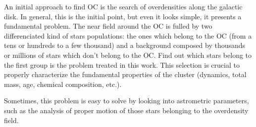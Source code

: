 \documentclass[11pt, a4paper, english]{book}
\begin{document}

An initial approach to find OC is the search of overdensities along the galactic disk. In general, this is the initial point,
but even it looks simple, it presents a fundamental problem. The near field around the OC is fulled by two differenciated
kind of stars populations: the ones which belong to the OC (from a tens or hundreds to a few thousand) and a background composed
by thousands or millions of stars which don't belong to the OC. Find out which stars belong to the first group is the problem
treated in this work. This selection is crucial to properly characterize the fundamental properties of the cluster
(dynamics, total mass, age, chemical composition, etc.).

Sometimes, this problem is easy to solve by looking into astrometric parameters, such as the analysis of proper motion of those
stars belonging to the overdensity field.
\end{document}
